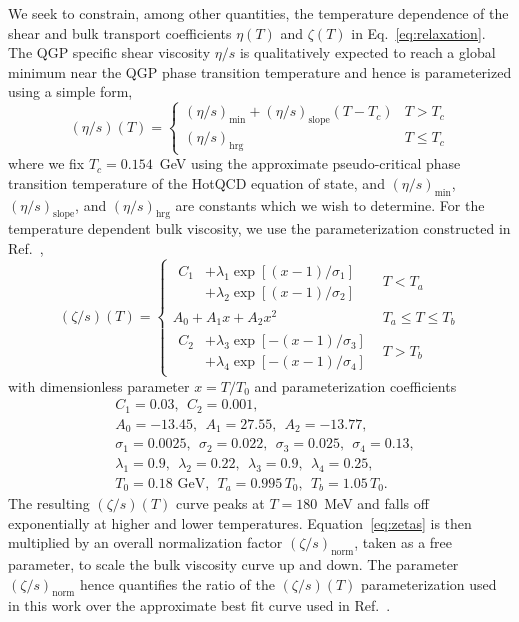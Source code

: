 \documentclass[aps,prc,reprint,amsmath,nofootinbib,superscriptaddress]{revtex4-1}
\begin{document}
We seek to constrain, among other quantities, the temperature dependence of the shear and bulk transport coefficients $\eta(T)$ and $\zeta(T)$ in Eq.~\eqref{eq:relaxation}.
The QGP specific shear viscosity $\eta/s$ is qualitatively expected to reach a global minimum near the QGP phase transition temperature and hence is parameterized using a simple form,
\begin{equation}
  (\eta/s)(T) =
  \begin{cases}
    (\eta/s)_\text{min} + (\eta/s)_\text{slope} (T - T_c) & T > T_c \\
    (\eta/s)_\text{hrg}                                   & T \le T_c
  \end{cases}
  \label{eq:etas}
\end{equation}
where we fix $T_c = 0.154$~GeV using the approximate pseudo-critical phase transition temperature of the HotQCD equation of state, and $(\eta/s)_\text{min}$, $(\eta/s)_\text{slope}$, and $(\eta/s)_\text{hrg}$ are constants which we wish to determine.
For the temperature dependent bulk viscosity, we use the parameterization constructed in Ref.~\cite{Denicol:2009am, Ryu:2015vwa},
\begin{equation}
  (\zeta/s)(T) =
  \begin{cases}
    \begin{aligned}
      C_1 &+ \lambda_1 \exp [(x-1)/\sigma_1]  \\ &+ \lambda_2 \exp [ (x-1)/\sigma_2]
    \end{aligned}
    &T < T_a \\[3ex]
    A_0 + A_1 x + A_2 x^2 &T_a \le T \le T_b \\[2ex]
    \begin{aligned}
      C_2 &+ \lambda_3 \exp [-(x-1)/\sigma_3]  \\ &+ \lambda_4 \exp [-(x-1)/\sigma_4]
    \end{aligned}
    &T > T_b
  \end{cases}
  \label{eq:zetas}
\end{equation}
with dimensionless parameter $x = T/T_0$ and parameterization coefficients
\begin{align*}
  &C_1=0.03, ~~C_2=0.001, \\
  &A_0=-13.45, ~~A_1=27.55, ~~A_2=-13.77, \\
  &\sigma_1=0.0025, ~~\sigma_2=0.022, ~~\sigma_3=0.025, ~~\sigma_4=0.13, \\
  &\lambda_1=0.9, ~~\lambda_2=0.22, ~~\lambda_3=0.9, ~~\lambda_4=0.25, \\
  &T_0 = 0.18 \text{ GeV}, ~~T_a = 0.995\, T_0, ~~T_b = 1.05\, T_0.
\end{align*}
The resulting $(\zeta/s)(T)$ curve peaks at $T=180$~MeV and falls off exponentially at higher and lower temperatures. Equation~\eqref{eq:zetas} is then multiplied by an overall normalization factor $(\zeta/s)_\text{norm}$, taken as a free parameter, to scale the bulk viscosity curve up and down. The parameter $(\zeta/s)_\text{norm}$ hence quantifies the ratio of the $(\zeta/s)(T)$ parameterization used in this work over the approximate best fit curve used in Ref.~\cite{Ryu:2015vwa}.
\end{document}
